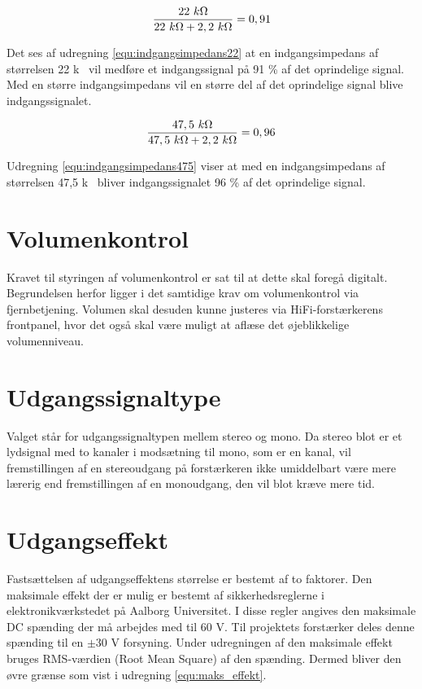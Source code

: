 \begin{equation}
\label{equ:indgangsimpedans22}
\frac{22~k\ohm}{22~k\ohm + 2,2~k\ohm} = 0,91
\end{equation}

Det ses af udregning \ref{equ:indgangsimpedans22} at en indgangsimpedans af størrelsen 22 k\ohm~ vil medføre et indgangssignal på 91 \% af det oprindelige signal. Med en større indgangsimpedans vil en større del af det oprindelige signal blive indgangssignalet. 

\begin{equation}
\label{equ:indgangsimpedans475}
\frac{47,5~k\ohm}{47,5~k\ohm + 2,2~k\ohm} = 0,96
\end{equation}

Udregning \ref{equ:indgangsimpedans475} viser at med en indgangsimpedans af størrelsen 47,5 k\ohm~ bliver indgangssignalet 96 \% af det oprindelige signal.

\section{Volumenkontrol}
\label{krav_volumenkontrol}
Kravet til styringen af volumenkontrol er sat til at dette skal foregå digitalt. Begrundelsen herfor ligger i det samtidige krav om volumenkontrol via fjernbetjening. Volumen skal desuden kunne justeres via HiFi-forstærkerens frontpanel, hvor det også skal være muligt at aflæse det øjeblikkelige volumenniveau.  

\section{Udgangssignaltype}
\label{krav_udgangssignaltype}
Valget står for udgangssignaltypen mellem stereo og mono. Da stereo blot er et lydsignal med to kanaler i modsætning til mono, som er en kanal, vil fremstillingen af en stereoudgang på forstærkeren ikke umiddelbart være mere lærerig end fremstillingen af en monoudgang, den vil blot kræve mere tid. 

\section{Udgangseffekt}
\label{krav_udgangseffekt}
Fastsættelsen af udgangseffektens størrelse er bestemt af to faktorer. Den maksimale effekt der er mulig er bestemt af sikkerhedsreglerne i elektronikværkstedet på Aalborg Universitet. I disse regler angives den maksimale DC spænding der må arbejdes med til 60 V. Til projektets forstærker deles denne spænding til en $\pm$30 V forsyning. Under udregningen af den maksimale effekt bruges RMS-værdien (Root Mean Square) af den spænding. Dermed bliver den øvre grænse som vist i udregning \ref{equ:maks_effekt}.

